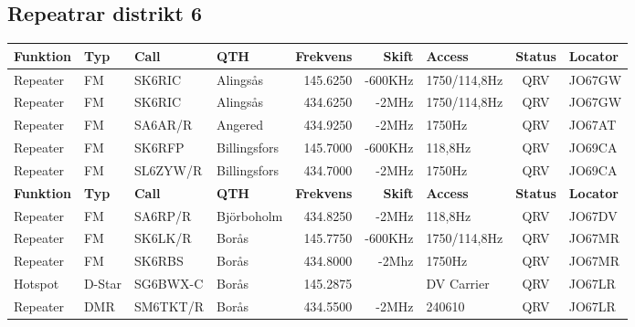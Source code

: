 \begin{landscape}
\subsection{Repeatrar distrikt 6}
\footnotesize
\begin{longtable}{llllrrlcl}
	\textbf{Funktion} & \textbf{Typ} & \textbf{Call} & \textbf{QTH}        & \textbf{Frekvens} & \textbf{Skift} & \textbf{Access} & \textbf{Status} & \textbf{Locator} \\ \hline
	Repeater          & FM           & SK6RIC        & Alingsås            &          145.6250 &        -600KHz & 1750/114,8Hz    &       QRV       & JO67GW           \\
	Repeater          & FM           & SK6RIC        & Alingsås            &          434.6250 &          -2MHz & 1750/114,8Hz    &       QRV       & JO67GW           \\
	Repeater          & FM           & SA6AR/R       & Angered             &          434.9250 &          -2MHz & 1750Hz          &       QRV       & JO67AT           \\
	Repeater          & FM           & SK6RFP        & Billingsfors        &          145.7000 &        -600KHz & 118,8Hz         &       QRV       & JO69CA           \\
	Repeater          & FM           & SL6ZYW/R      & Billingsfors        &          434.7000 &          -2MHz & 1750Hz          &       QRV       & JO69CA           \\
		\textbf{Funktion} & \textbf{Typ} & \textbf{Call} & \textbf{QTH}        & \textbf{Frekvens} & \textbf{Skift} & \textbf{Access} & \textbf{Status} & \textbf{Locator} \\ \hline
	Repeater          & FM           & SA6RP/R       & Björboholm          &          434.8250 &          -2MHz & 118,8Hz         &       QRV       & JO67DV           \\
	Repeater          & FM           & SK6LK/R       & Borås               &          145.7750 &        -600KHz & 1750/114,8Hz    &       QRV       & JO67MR           \\
	Repeater          & FM           & SK6RBS        & Borås               &          434.8000 &          -2Mhz & 1750Hz          &       QRV       & JO67MR           \\
	Hotspot           & D-Star       & SG6BWX-C      & Borås               &          145.2875 &                & DV Carrier      &       QRV       & JO67LR           \\
	Repeater          & DMR          & SM6TKT/R      & Borås               &          434.5500 &          -2MHz & 240610          &       QRV       & JO67LR           \\

\end{longtable}
\end{landscape}
